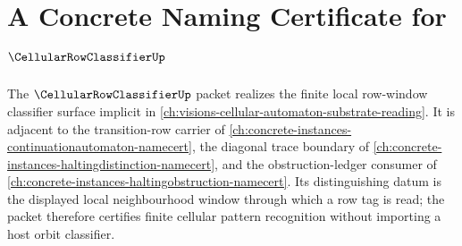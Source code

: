 \chapter{A Concrete Naming Certificate for $\CellularRowClassifierUp$}
\label{ch:concrete-instances-cellularrowclassifier-namecert}

The $\CellularRowClassifierUp$ packet realizes the finite local row-window classifier surface implicit in \autoref{ch:visions-cellular-automaton-substrate-reading}. It is adjacent to the transition-row carrier of \autoref{ch:concrete-instances-continuationautomaton-namecert}, the diagonal trace boundary of \autoref{ch:concrete-instances-haltingdistinction-namecert}, and the obstruction-ledger consumer of \autoref{ch:concrete-instances-haltingobstruction-namecert}. Its distinguishing datum is the displayed local neighbourhood window through which a row tag is read; the packet therefore certifies finite cellular pattern recognition without importing a host orbit classifier.




